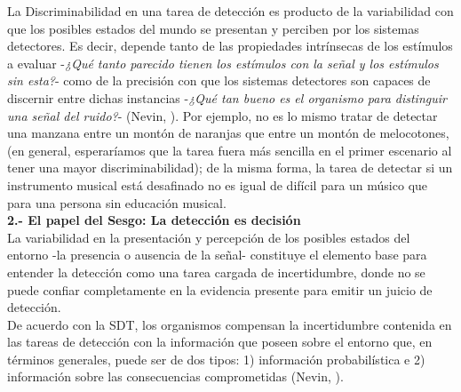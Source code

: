 La Discriminabilidad en una tarea de detección es producto de la variabilidad con que los posibles estados del mundo se presentan y perciben por los sistemas detectores. Es decir, depende tanto de las propiedades intrínsecas de los estímulos a evaluar -\textit{¿Qué tanto parecido tienen los estímulos con la señal y los estímulos sin esta?}- como de la precisión con que los sistemas detectores son capaces de discernir entre dichas instancias -\textit{¿Qué tan bueno es el organismo para distinguir una señal del ruido?}- (Nevin, \citeyear{Nevin1969}). Por ejemplo, no es lo mismo tratar de detectar una manzana entre un montón de naranjas que entre un montón de melocotones, (en general, esperaríamos que la tarea fuera más sencilla en el primer escenario al tener una mayor discriminabilidad); de la misma forma, la tarea de detectar si un instrumento musical está desafinado no es igual de difícil para un músico que para una persona sin educación musical.\\

  \textbf{2.- El papel del Sesgo: La detección es decisión}\\

La variabilidad en la presentación y percepción de los posibles estados del entorno -la presencia o ausencia de la señal- constituye el elemento base para entender la detección como una tarea cargada de incertidumbre, donde no se puede confiar completamente en la evidencia presente para emitir un juicio de detección.\\

De acuerdo con la SDT, los organismos compensan la incertidumbre contenida en las tareas de detección con la información que poseen sobre el entorno que, en términos generales, puede ser de dos tipos: 1) información probabilística e 2) información sobre las consecuencias comprometidas (Nevin, \citeyear{Nevin1969}).\\

